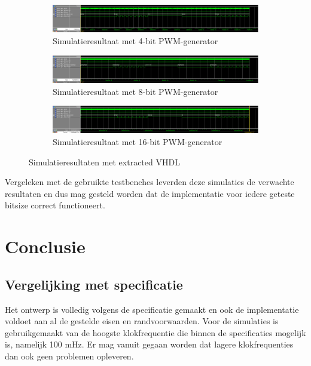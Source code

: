 \documentclass{article}
\begin{document}
\begin{figure}[H]
	\centering
	\begin{subfigure}{\textwidth}
		\includegraphics[width=\textwidth]{resource/pwm_gen_sim_4bit.png}
		\caption{Simulatieresultaat met 4-bit PWM-generator}
		\label{sfig:pwm-sim-4bit}
	\end{subfigure}
	\newline
	\begin{subfigure}{\textwidth}
		\includegraphics[width=\textwidth]{resource/pwm_gen_sim_8bit.png}
		\caption{Simulatieresultaat met 8-bit PWM-generator}
		\label{sfig:pwm-sim-8bit}
	\end{subfigure}
	\newline
	\begin{subfigure}{\textwidth}
		\includegraphics[width=\textwidth]{resource/pwm_gen_sim_16bit.png}
		\caption{Simulatieresultaat met 16-bit PWM-generator}
		\label{sfig:pwm-sim-16bit}
	\end{subfigure}
	\caption{Simulatieresultaten met extracted VHDL}
	\label{fig:pwm-sim}
\end{figure}

Vergeleken met de gebruikte testbenches leverden deze simulaties de verwachte resultaten en dus mag gesteld worden dat de implementatie voor iedere geteste bitsize correct functioneert.

\section{Conclusie}
\label{sec:pwm-conclusie}

\subsection{Vergelijking met specificatie}
\label{ssec:pwm-conclusie-spec-comp}
Het ontwerp is volledig volgens de specificatie gemaakt en ook de implementatie voldoet aan al de gestelde eisen en randvoorwaarden. Voor de simulaties is gebruikgemaakt van de hoogste klokfrequentie die binnen de specificaties mogelijk is, namelijk 100 mHz. Er mag vanuit gegaan worden dat lagere klokfrequenties dan ook geen problemen opleveren.
\end{document}

